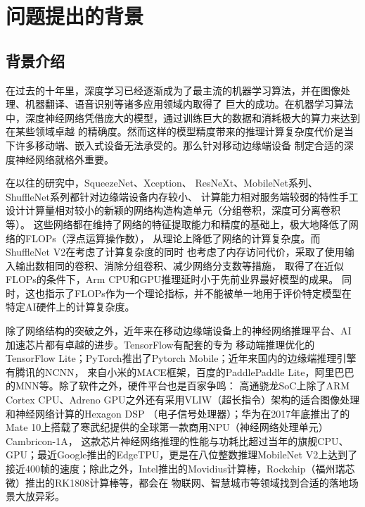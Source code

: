 \section{问题提出的背景}

\subsection{背景介绍}

在过去的十年里，深度学习已经逐渐成为了最主流的机器学习算法，并在图像处理、机器翻译、语音识别等诸多应用领域内取得了
巨大的成功。在机器学习算法中，深度神经网络凭借庞大的模型，通过训练巨大的数据和消耗极大的算力来达到在某些领域卓越
的精确度。然而这样的模型精度带来的推理计算复杂度代价是当下许多移动端、嵌入式设备无法承受的。那么针对移动边缘端设备
制定合适的深度神经网络就格外重要。

在以往的研究中，SqueezeNet\cite{iandola2016squeezenet}、Xception\cite{chollet2017xception}、
ResNeXt\cite{xie2017aggregated}、MobileNet系列\cite{howard2017mobilenets, sandler2018mobilenetv2}、
ShuffleNet系列\cite{zhang2018shufflenet,ma2018shufflenet}都针对边缘端设备内存较小、
计算能力相对服务端较弱的特性手工设计计算量相对较小的新颖的网络构造构造单元（分组卷积，深度可分离卷积等）。
这些网络都在维持了网络的特征提取能力和精度的基础上，极大地降低了网络的FLOPs（浮点运算操作数），
从理论上降低了网络的计算复杂度。而ShuffleNet V2\cite{ma2018shufflenet}在考虑了计算复杂度的同时
也考虑了内存访问代价，采取了使用输入输出数相同的卷积、消除分组卷积、减少网络分支数等措施，
取得了在近似FLOPs的条件下，Arm CPU和GPU推理延时小于先前业界最好模型的成果。
同时，这也指示了FLOPs作为一个理论指标，并不能被单一地用于评价特定模型在特定AI硬件上的计算复杂度。

除了网络结构的突破之外，近年来在移动边缘端设备上的神经网络推理平台、AI加速芯片都有卓越的进步。TensorFlow有配套的专为
移动端推理优化的TensorFlow Lite；PyTorch推出了Pytorch Mobile；近年来国内的边缘端推理引擎有腾讯的NCNN，
来自小米的MACE框架，百度的PaddlePaddle Lite，阿里巴巴的MNN等。除了软件之外，硬件平台也是百家争鸣：
高通骁龙SoC上除了ARM Cortex CPU、Adreno GPU之外还有采用VLIW（超长指令）架构的适合图像处理和神经网络计算的Hexagon DSP
（电子信号处理器）；华为在2017年底推出了的Mate 10上搭载了寒武纪提供的全球第一款商用NPU（神经网络处理单元）Cambricon-1A，
这款芯片神经网络推理的性能与功耗比超过当年的旗舰CPU、GPU；最近Google推出的EdgeTPU，更是在八位整数推理MobileNet V2上达到了
接近400帧的速度；除此之外，Intel推出的Movidius计算棒，Rockchip（福州瑞芯微）推出的RK1808计算棒等，都会在
物联网、智慧城市等领域找到合适的落地场景大放异彩。


